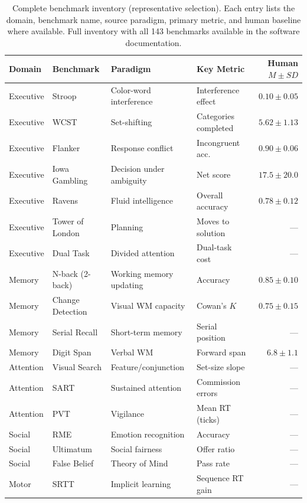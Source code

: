 \documentclass[11pt,letterpaper]{article}
\begin{document}
\begin{table}[p]
\centering
\caption{Complete benchmark inventory (representative selection). Each entry lists the domain, benchmark name, source paradigm, primary metric, and human baseline where available. Full inventory with all 143 benchmarks available in the software documentation.}
\label{tab:inventory}
\small
\begin{tabular}{@{}llllr@{}}
\toprule
\textbf{Domain} & \textbf{Benchmark} & \textbf{Paradigm} & \textbf{Key Metric} & \textbf{Human $M \pm SD$} \\
\midrule
Executive & Stroop & Color-word interference & Interference effect & $0.10 \pm 0.05$ \\
Executive & WCST & Set-shifting & Categories completed & $5.62 \pm 1.13$ \\
Executive & Flanker & Response conflict & Incongruent acc. & $0.90 \pm 0.06$ \\
Executive & Iowa Gambling & Decision under ambiguity & Net score & $17.5 \pm 20.0$ \\
Executive & Ravens & Fluid intelligence & Overall accuracy & $0.78 \pm 0.12$ \\
Executive & Tower of London & Planning & Moves to solution & --- \\
Executive & Dual Task & Divided attention & Dual-task cost & --- \\
\midrule
Memory & N-back (2-back) & Working memory updating & Accuracy & $0.85 \pm 0.10$ \\
Memory & Change Detection & Visual WM capacity & Cowan's $K$ & $0.75 \pm 0.15$ \\
Memory & Serial Recall & Short-term memory & Serial position & --- \\
Memory & Digit Span & Verbal WM & Forward span & $6.8 \pm 1.1$ \\
\midrule
Attention & Visual Search & Feature/conjunction & Set-size slope & --- \\
Attention & SART & Sustained attention & Commission errors & --- \\
Attention & PVT & Vigilance & Mean RT (ticks) & --- \\
\midrule
Social & RME & Emotion recognition & Accuracy & --- \\
Social & Ultimatum & Social fairness & Offer ratio & --- \\
Social & False Belief & Theory of Mind & Pass rate & --- \\
\midrule
Motor & SRTT & Implicit learning & Sequence RT gain & --- \\

\end{tabular}
\end{table}
\end{document}
